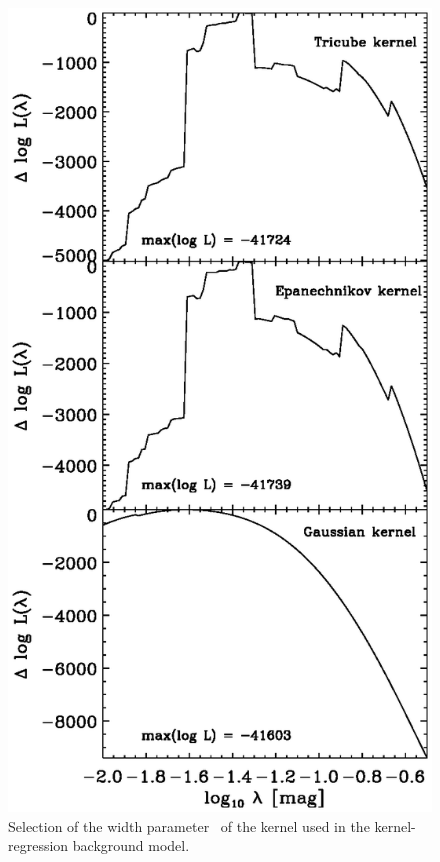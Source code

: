 \clearpage
\begin{figure}
\includegraphics{figs_groups/loo_back_log.ps}
\caption[Selection of the width parameter \ of the kernel
  used in the kernel-regression background model]{Selection of the
  width parameter \ of the kernel used in the
  kernel-regression background model.}\label{fig:kernelwidthselection}
\end{figure}


